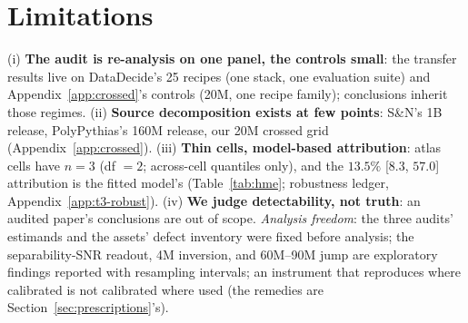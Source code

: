 \section{Limitations}
\label{sec:limitations}

(i) \textbf{The audit is re-analysis on one panel, the controls small}: the transfer results live on DataDecide's 25 recipes (one stack, one evaluation suite) and Appendix~\ref{app:crossed}'s controls (20M, one recipe family); conclusions inherit those regimes.
(ii) \textbf{Source decomposition exists at few points}: S\&N's 1B release, PolyPythias's 160M release, our 20M crossed grid
(Appendix~\ref{app:crossed}).
(iii) \textbf{Thin cells, model-based attribution}: atlas cells have $n = 3$ (df $= 2$; across-cell quantiles only), and the $13.5\%$
[$8.3$, $57.0$] attribution is the fitted model's (Table~\ref{tab:hme}; robustness ledger, Appendix~\ref{app:t3-robust}). (iv) \textbf{We judge detectability, not truth}: an audited paper's conclusions are out of scope.
\emph{Analysis freedom}: the three audits' estimands and the assets' defect inventory were fixed before analysis; the separability-SNR readout, 4M inversion, and 60M--90M jump are exploratory findings reported with resampling intervals; an instrument that reproduces where calibrated is not calibrated where used (the remedies are Section~\ref{sec:prescriptions}'s).
